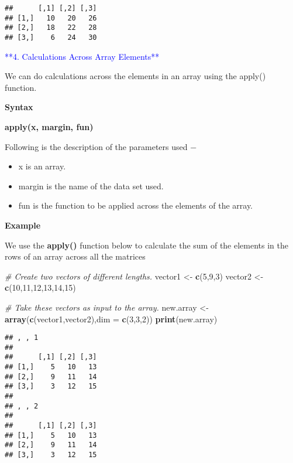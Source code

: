 \documentclass[
]{article}
\newenvironment{Shaded}{\begin{snugshade}}{\end{snugshade}}
\newcommand{\AttributeTok}[1]{\textcolor[rgb]{0.13,0.29,0.53}{#1}}
\newcommand{\CommentTok}[1]{\textcolor[rgb]{0.56,0.35,0.01}{\textit{#1}}}
\newcommand{\DecValTok}[1]{\textcolor[rgb]{0.00,0.00,0.81}{#1}}
\newcommand{\FunctionTok}[1]{\textcolor[rgb]{0.13,0.29,0.53}{\textbf{#1}}}
\newcommand{\NormalTok}[1]{#1}
\newcommand{\OtherTok}[1]{\textcolor[rgb]{0.56,0.35,0.01}{#1}}
\providecommand{\tightlist}{%
  \setlength{\itemsep}{0pt}\setlength{\parskip}{0pt}}
\begin{document}
\begin{verbatim}
##      [,1] [,2] [,3]
## [1,]   10   20   26
## [2,]   18   22   28
## [3,]    6   24   30
\end{verbatim}

\textcolor{blue}{**4. Calculations Across Array Elements**}

We can do calculations across the elements in an array using the apply()
function.

\textbf{Syntax}

\textbf{apply(x, margin, fun)}

Following is the description of the parameters used −

\begin{itemize}
\tightlist
\item
  x is an array.
\item
  margin is the name of the data set used.
\item
  fun is the function to be applied across the elements of the array.
\end{itemize}

\textbf{Example}

We use the \textbf{apply()} function below to calculate the sum of the
elements in the rows of an array across all the matrices

\begin{Shaded}
\begin{Highlighting}[]
\CommentTok{\# Create two vectors of different lengths.}
\NormalTok{vector1 }\OtherTok{\textless{}{-}} \FunctionTok{c}\NormalTok{(}\DecValTok{5}\NormalTok{,}\DecValTok{9}\NormalTok{,}\DecValTok{3}\NormalTok{)}
\NormalTok{vector2 }\OtherTok{\textless{}{-}} \FunctionTok{c}\NormalTok{(}\DecValTok{10}\NormalTok{,}\DecValTok{11}\NormalTok{,}\DecValTok{12}\NormalTok{,}\DecValTok{13}\NormalTok{,}\DecValTok{14}\NormalTok{,}\DecValTok{15}\NormalTok{)}

\CommentTok{\# Take these vectors as input to the array.}
\NormalTok{new.array }\OtherTok{\textless{}{-}} \FunctionTok{array}\NormalTok{(}\FunctionTok{c}\NormalTok{(vector1,vector2),}\AttributeTok{dim =} \FunctionTok{c}\NormalTok{(}\DecValTok{3}\NormalTok{,}\DecValTok{3}\NormalTok{,}\DecValTok{2}\NormalTok{))}
\FunctionTok{print}\NormalTok{(new.array)}
\end{Highlighting}
\end{Shaded}

\begin{verbatim}
## , , 1
## 
##      [,1] [,2] [,3]
## [1,]    5   10   13
## [2,]    9   11   14
## [3,]    3   12   15
## 
## , , 2
## 
##      [,1] [,2] [,3]
## [1,]    5   10   13
## [2,]    9   11   14
## [3,]    3   12   15
\end{verbatim}
\end{document}
